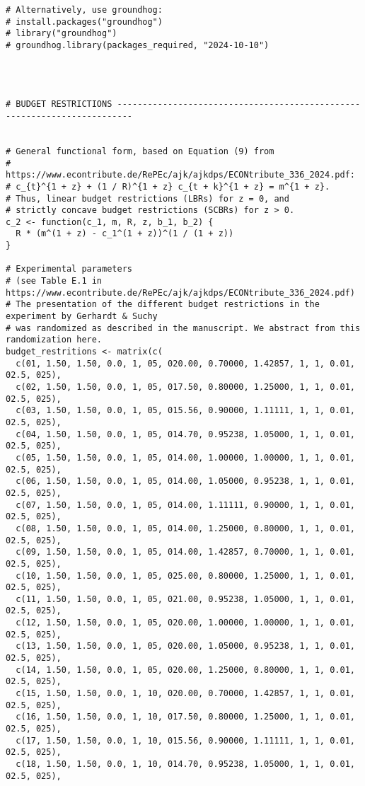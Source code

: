 \documentclass[12pt, a4paper, oneside]{article}
\theoremstyle{Plain}
\theoremstyle{Definition}
\theoremstyle{Remark}
\begin{document}
\begin{appendix}
\begin{lstlisting}
# Alternatively, use groundhog:
# install.packages("groundhog")
# library("groundhog")
# groundhog.library(packages_required, "2024-10-10")




# BUDGET RESTRICTIONS -------------------------------------------------------------------------


# General functional form, based on Equation (9) from
# https://www.econtribute.de/RePEc/ajk/ajkdps/ECONtribute_336_2024.pdf:
# c_{t}^{1 + z} + (1 / R)^{1 + z} c_{t + k}^{1 + z} = m^{1 + z}.
# Thus, linear budget restrictions (LBRs) for z = 0, and
# strictly concave budget restrictions (SCBRs) for z > 0.
c_2 <- function(c_1, m, R, z, b_1, b_2) {
  R * (m^(1 + z) - c_1^(1 + z))^(1 / (1 + z))
}

# Experimental parameters
# (see Table E.1 in https://www.econtribute.de/RePEc/ajk/ajkdps/ECONtribute_336_2024.pdf)
# The presentation of the different budget restrictions in the experiment by Gerhardt & Suchy
# was randomized as described in the manuscript. We abstract from this randomization here.
budget_restritions <- matrix(c(
  c(01, 1.50, 1.50, 0.0, 1, 05, 020.00, 0.70000, 1.42857, 1, 1, 0.01, 02.5, 025),
  c(02, 1.50, 1.50, 0.0, 1, 05, 017.50, 0.80000, 1.25000, 1, 1, 0.01, 02.5, 025),
  c(03, 1.50, 1.50, 0.0, 1, 05, 015.56, 0.90000, 1.11111, 1, 1, 0.01, 02.5, 025),
  c(04, 1.50, 1.50, 0.0, 1, 05, 014.70, 0.95238, 1.05000, 1, 1, 0.01, 02.5, 025),
  c(05, 1.50, 1.50, 0.0, 1, 05, 014.00, 1.00000, 1.00000, 1, 1, 0.01, 02.5, 025),
  c(06, 1.50, 1.50, 0.0, 1, 05, 014.00, 1.05000, 0.95238, 1, 1, 0.01, 02.5, 025),
  c(07, 1.50, 1.50, 0.0, 1, 05, 014.00, 1.11111, 0.90000, 1, 1, 0.01, 02.5, 025),
  c(08, 1.50, 1.50, 0.0, 1, 05, 014.00, 1.25000, 0.80000, 1, 1, 0.01, 02.5, 025),
  c(09, 1.50, 1.50, 0.0, 1, 05, 014.00, 1.42857, 0.70000, 1, 1, 0.01, 02.5, 025),
  c(10, 1.50, 1.50, 0.0, 1, 05, 025.00, 0.80000, 1.25000, 1, 1, 0.01, 02.5, 025),
  c(11, 1.50, 1.50, 0.0, 1, 05, 021.00, 0.95238, 1.05000, 1, 1, 0.01, 02.5, 025),
  c(12, 1.50, 1.50, 0.0, 1, 05, 020.00, 1.00000, 1.00000, 1, 1, 0.01, 02.5, 025),
  c(13, 1.50, 1.50, 0.0, 1, 05, 020.00, 1.05000, 0.95238, 1, 1, 0.01, 02.5, 025),
  c(14, 1.50, 1.50, 0.0, 1, 05, 020.00, 1.25000, 0.80000, 1, 1, 0.01, 02.5, 025),
  c(15, 1.50, 1.50, 0.0, 1, 10, 020.00, 0.70000, 1.42857, 1, 1, 0.01, 02.5, 025),
  c(16, 1.50, 1.50, 0.0, 1, 10, 017.50, 0.80000, 1.25000, 1, 1, 0.01, 02.5, 025),
  c(17, 1.50, 1.50, 0.0, 1, 10, 015.56, 0.90000, 1.11111, 1, 1, 0.01, 02.5, 025),
  c(18, 1.50, 1.50, 0.0, 1, 10, 014.70, 0.95238, 1.05000, 1, 1, 0.01, 02.5, 025),

\end{lstlisting}
\end{appendix}
\end{document}
